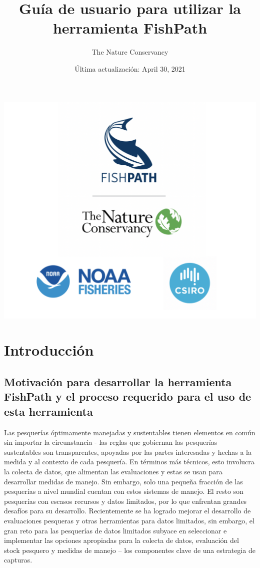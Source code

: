 \documentclass[
  11pt,
]{book}
\title{Guía de usuario para utilizar la herramienta FishPath}
\author{The Nature Conservancy}
\date{Última actualización: April 30, 2021}
\begin{document}
\maketitle

{
\setcounter{tocdepth}{1}
\tableofcontents
}
\hypertarget{section}{%
\chapter*{}\label{section}}

\begin{center}\includegraphics[width=0.75\linewidth]{images/3-logos} \end{center}

\hypertarget{intro}{%
\chapter{Introducción}\label{intro}}

\hypertarget{motivation}{%
\section{Motivación para desarrollar la herramienta FishPath y el proceso requerido para el uso de esta herramienta}\label{motivation}}

Las pesquerías óptimamente manejadas y sustentables tienen elementos en común sin importar la circunstancia - las reglas que gobiernan las pesquerías sustentables son transparentes, apoyadas por las partes interesadas y hechas a la medida y al contexto de cada pesquería. En términos más técnicos, esto involucra la colecta de datos, que alimentan las evaluaciones y estas se usan para desarrollar medidas de manejo. Sin embargo, solo una pequeña fracción de las pesquerías a nivel mundial cuentan con estos sistemas de manejo. El resto son pesquerías con escasos recursos y datos limitados, por lo que enfrentan grandes desafíos para su desarrollo. Recientemente se ha logrado mejorar el desarrollo de evaluaciones pesqueras y otras herramientas para datos limitados, sin embargo, el gran reto para las pesquerías de datos limitados subyace en seleccionar e implementar las opciones apropiadas para la colecta de datos, evaluación del stock pesquero y medidas de manejo -- los componentes clave de una estrategia de capturas.
\end{document}
